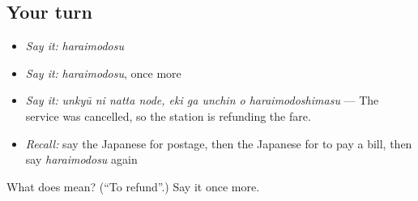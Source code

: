 \subsection*{Your turn}
\begin{itemize}
\raggedright
  \item \emph{Say it:} \emph{haraimodosu}
  \item \emph{Say it:} \emph{haraimodosu}, once more
  \item \emph{Say it:} \emph{unkyū ni natta node, eki ga unchin o haraimodoshimasu} — The service was cancelled, so the station is refunding the fare.
  \item \emph{Recall:} say the Japanese for postage, then the Japanese for to pay a bill, then say \emph{haraimodosu} again
\end{itemize}

\begin{tcolorbox}[breakable,colback=teal!4,colframe=teal!35!black,title={Before you move on}]
What does  mean? (\textquotedblleft{}To refund\textquotedblright{}.) Say it once more.
\end{tcolorbox}
